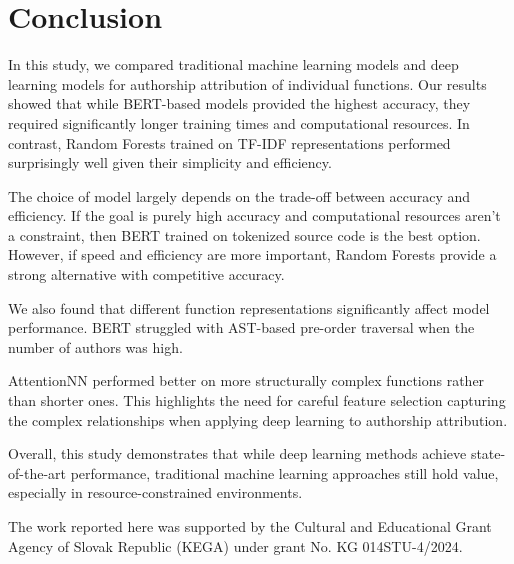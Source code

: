 \documentclass[conference]{IEEEtran}
\begin{document}
\section{Conclusion}

In this study, we compared traditional machine learning models and deep learning models for authorship attribution of individual functions. 
Our results showed that while BERT-based models provided the highest accuracy, they required significantly longer training times and 
computational resources. In contrast, Random Forests trained on TF-IDF representations performed surprisingly well given their simplicity 
and efficiency.

The choice of model largely depends on the trade-off between accuracy and efficiency. If the goal is purely high accuracy and computational 
resources aren’t a constraint, then BERT trained on tokenized source code is the best option. However, if speed and efficiency are more 
important, Random Forests provide a strong alternative with competitive accuracy.

We also found that different function representations significantly affect model performance. BERT struggled with AST-based pre-order 
traversal when the number of authors was high. 

AttentionNN performed better on more structurally complex functions rather than shorter ones. This highlights the need for 
careful feature selection capturing the complex relationships when applying deep learning to authorship attribution.

Overall, this study demonstrates that while deep learning methods achieve state-of-the-art performance, traditional 
machine learning approaches still hold value, especially in resource-constrained environments.

\begin{acks}
    The work reported here was supported by the 
    Cultural and Educational Grant Agency of Slovak 
    Republic (KEGA) under grant No. KG 014STU-4/2024.
\end{acks}



\end{document}
